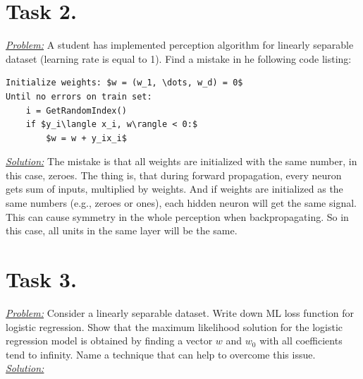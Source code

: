 \documentclass[a4paper,12pt]{article}
\begin{document}
\newpage
\section*{Task 2.}
\underline{\textit{Problem:}} A student has implemented perception algorithm for linearly separable dataset (learning rate is equal
to 1). Find a mistake in he following code listing:
\begin{lstlisting}[mathescape]
Initialize weights: $w = (w_1, \dots, w_d) = 0$
Until no errors on train set:
    i = GetRandomIndex()
    if $y_i\langle x_i, w\rangle < 0:$
        $w = w + y_ix_i$
\end{lstlisting}
\underline{\textit{Solution:}} The mistake is that all weights are initialized
with the same number, in this case, zeroes. The thing is, that during forward
propagation, every neuron gets sum of inputs, multiplied by weights. And if
weights are initialized as the same numbers (e.g., zeroes or ones), each hidden
neuron will get the same signal. This can cause symmetry in the whole
perception when backpropagating. So in this case, all units in the same layer
will be the same.

\newpage
\section*{Task 3.}
\underline{\textit{Problem:}} Consider a linearly separable dataset. Write down ML loss function for logistic regression. Show that
the maximum likelihood solution for the logistic regression model is obtained by finding a vector \(w\) and
\(w_0\) with all coefficients tend to infinity.
Name a technique that can help to overcome this issue.\\
\newline
\underline{\textit{Solution:}}
\end{document}
